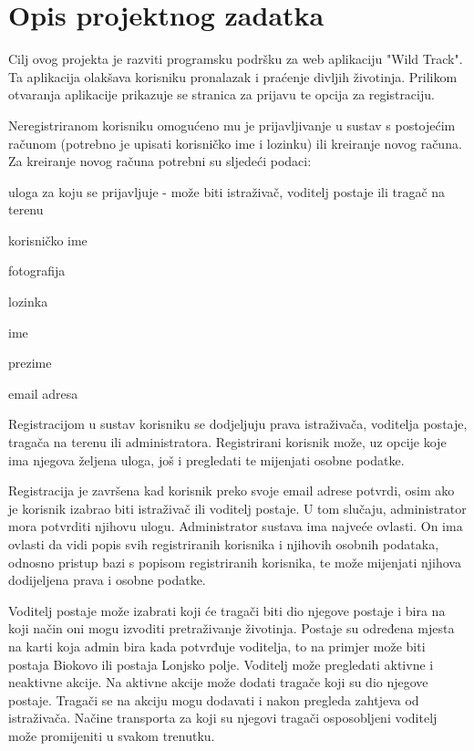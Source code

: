 \chapter{Opis projektnog zadatka}
		
	Cilj ovog projekta je razviti programsku podršku za web aplikaciju "Wild Track".
	Ta aplikacija olakšava korisniku pronalazak i praćenje divljih životinja.
	Prilikom otvaranja aplikacije prikazuje se stranica za prijavu te opcija za registraciju.	
	
	Neregistriranom korisniku omogućeno mu je prijavljivanje u sustav s postojećim računom (potrebno je upisati korisničko ime i lozinku) ili kreiranje novog računa. 
	Za kreiranje novog računa potrebni su sljedeći podaci: 
	\begin{packed_item}
		\item uloga za koju se prijavljuje - može biti istraživač, voditelj postaje ili tragač na terenu
		\item korisničko ime 
		\item fotografija
		\item lozinka
		\item ime
		\item prezime
		\item email adresa
	\end{packed_item}

	Registracijom u sustav korisniku se dodjeljuju prava istraživača, voditelja postaje, tragača na terenu ili administratora.
	Registrirani korisnik može, uz opcije koje ima njegova željena uloga, još i pregledati te mijenjati osobne podatke.

	Registracija je završena kad korisnik preko svoje email adrese potvrdi, osim ako je korisnik izabrao biti istraživač ili voditelj postaje. 
	U tom slučaju, administrator mora potvrditi njihovu ulogu. 
	Administrator sustava ima najveće ovlasti. 
	On ima ovlasti da vidi popis svih registriranih korisnika i njihovih osobnih podataka, odnosno pristup bazi s popisom registriranih korisnika, te može mijenjati njihova dodijeljena prava i osobne podatke.
	
	Voditelj postaje može izabrati koji će tragači biti dio njegove postaje i bira na koji način oni mogu izvoditi pretraživanje životinja. 
	Postaje su određena mjesta na karti koja admin bira kada potvrđuje voditelja, to na primjer može biti postaja Biokovo ili postaja Lonjsko polje.
	Voditelj može pregledati aktivne i neaktivne akcije. Na aktivne akcije može dodati tragače koji su dio njegove postaje. Tragači se na akciju mogu dodavati i nakon pregleda zahtjeva od istraživača.
	Načine transporta za koji su njegovi tragači osposobljeni voditelj može promijeniti u svakom trenutku.

